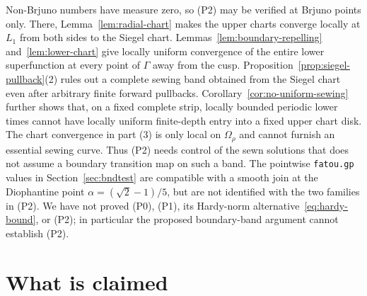 \documentclass[11pt,a4paper]{article}
\theoremstyle{definition}
\begin{document}
Non-Brjuno numbers have measure zero, so (P2) may be verified at Brjuno points
only.  There, Lemma~\ref{lem:radial-chart} makes the upper charts converge
locally at $L_1$ from both sides to the Siegel chart.
Lemmas~\ref{lem:boundary-repelling} and~\ref{lem:lower-chart} give locally
uniform convergence of the entire lower superfunction at every point of
$\Gamma$ away from the cusp.
Proposition~\ref{prop:siegel-pullback}(2) rules out a complete sewing
band obtained from the Siegel chart even after arbitrary finite forward
pullbacks.  Corollary~\ref{cor:no-uniform-sewing} further shows that, on a
fixed complete strip, locally bounded periodic lower times cannot have
locally uniform finite-depth entry into a fixed upper chart disk.
The chart convergence in part (3) is only local on
$\Omega_\rho$ and cannot furnish an essential sewing curve.  Thus (P2)
needs control of the sewn solutions that does not assume a boundary
transition map on such a band.  The pointwise \texttt{fatou.gp} values in
Section~\ref{sec:bndtest} are compatible with a smooth join at the
Diophantine point $\alpha=(\sqrt2-1)/5$, but are not identified with the
two families in (P2).  We have not proved (P0),
(P1), its Hardy-norm alternative~\eqref{eq:hardy-bound}, or (P2);
in particular the proposed boundary-band argument cannot
establish (P2).

\section{What is claimed}\label{sec:claims}
\end{document}
